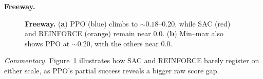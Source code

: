 \noindent \textbf{Freeway.}
\begin{figure}[htbp]
	\centering
	\quad
	\caption{\textbf{Freeway.}
		(\textbf{a}) PPO (blue) climbs to \(\sim0.18\)--0.20, while SAC (red) and REINFORCE (orange) remain near 0.0.
		(\textbf{b}) Min--max also shows PPO at \(\sim0.20\), with the others near 0.0.}
	\label{fig:freeway_combined}
\end{figure}

\noindent
\emph{Commentary.} Figure~\ref{fig:freeway_combined} illustrates how SAC and REINFORCE barely register on either scale, as PPO’s partial success reveals a bigger raw score gap.

\medskip

